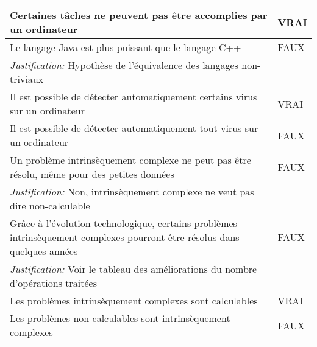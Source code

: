 \begin{longtable}{p{13cm}|l}
  Certaines tâches ne peuvent pas être accomplies par un ordinateur & VRAI \\
  \hline
  Le langage Java est plus puissant que le langage C++ & FAUX \\
  \textit{Justification:} Hypothèse de l'équivalence des langages non-triviaux & \\
  \hline
  Il est possible de détecter automatiquement certains virus sur un ordinateur & VRAI \\
  \hline
  Il est possible de détecter automatiquement tout virus sur un ordinateur & FAUX \\
  \hline
  Un problème intrinsèquement complexe ne peut pas être résolu, même pour des petites données & FAUX \\
  \textit{Justification:} Non, intrinsèquement complexe ne veut pas dire \og{} non-calculable \fg{}& \\
  \hline
  Grâce à l'évolution technologique, certains problèmes intrinsèquement complexes pourront être résolus dans quelques années & FAUX \\
  \textit{Justification:} Voir le tableau des améliorations du nombre d'opérations traitées & \\
  \hline
  Les problèmes intrinsèquement complexes sont calculables & VRAI \\
  \hline
  Les problèmes non calculables sont intrinsèquement complexes & FAUX \\
\end{longtable}
